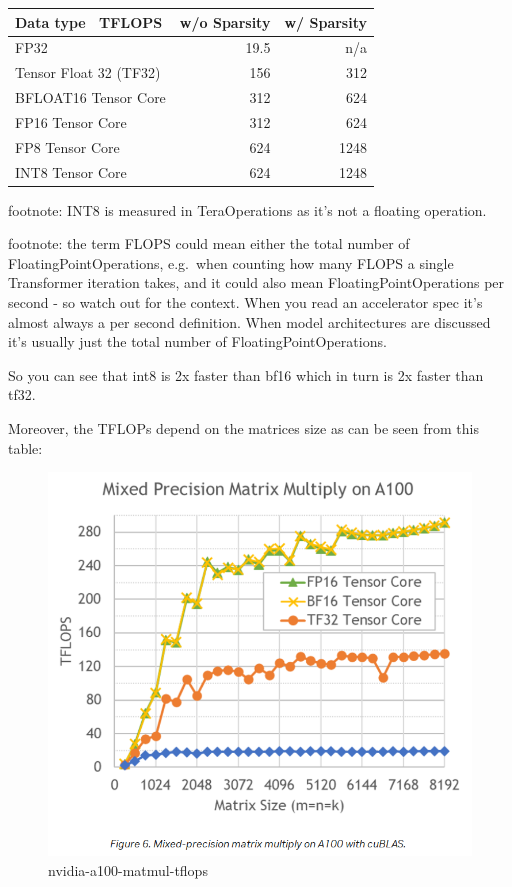 \documentclass[
]{report}
\begin{document}
\begin{longtable}[]{@{}lrr@{}}
\toprule\noalign{}
Data type ~TFLOPS & w/o Sparsity & w/ Sparsity \\
\midrule\noalign{}
\endhead
\bottomrule\noalign{}
\endlastfoot
FP32 & 19.5 & n/a \\
Tensor Float 32 (TF32) & 156 & 312 \\
BFLOAT16 Tensor Core & 312 & 624 \\
FP16 Tensor Core & 312 & 624 \\
FP8 Tensor Core & 624 & 1248 \\
INT8 Tensor Core & 624 & 1248 \\
\end{longtable}

footnote: INT8 is measured in TeraOperations as it's not a floating
operation.

footnote: the term FLOPS could mean either the total number of
FloatingPointOperations, e.g.~when counting how many FLOPS a single
Transformer iteration takes, and it could also mean
FloatingPointOperations per second - so watch out for the context. When
you read an accelerator spec it's almost always a per second definition.
When model architectures are discussed it's usually just the total
number of FloatingPointOperations.

So you can see that int8 is 2x faster than bf16 which in turn is 2x
faster than tf32.

Moreover, the TFLOPs depend on the matrices size as can be seen from
this table:

\begin{figure}[H]

{\centering \includegraphics{images/nvidia-a100-matmul-tflops.png}

}

\caption{nvidia-a100-matmul-tflops}

\end{figure}%
\end{document}

